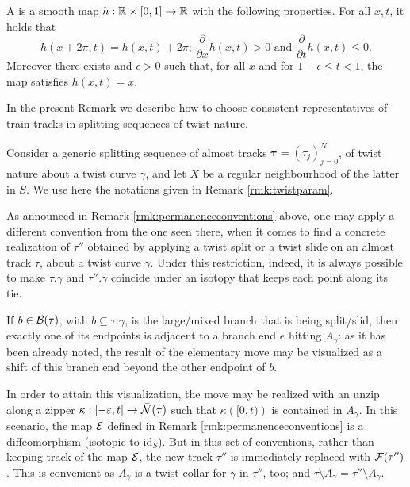\begin{defin}
A  is a smooth map $h:\mathbb R\times[0,1]\rightarrow \mathbb R$ with the following properties. For all $x,t$, it holds that
$$
h(x+2\pi,t)=h(x,t)+2\pi\text{; }\frac{\partial}{\partial x}h(x,t)>0 \text{ and }\frac{\partial}{\partial t} h(x,t)\leq 0.$$
Moreover there exists and $\epsilon>0$ such that, for all $x$ and for $1-\epsilon \leq t<1$, the map satisfies $h(x,t)=x$.
\end{defin}

\begin{rmk}\label{rmk:twistnaturemodelling}
In the present Remark we describe how to choose consistent representatives of train tracks in splitting sequences of twist nature.

Consider a generic splitting sequence of almost tracks $\bm\tau=(\tau_j)_{j=0}^N$, of twist nature about a twist curve $\gamma$, and let $X$ be a regular neighbourhood of the latter in $S$. We use here the notations given in Remark \ref{rmk:twistparam}. 

As announced in Remark \ref{rmk:permanenceconventions} above, one may apply a different convention from the one seen there, when it comes to find a concrete realization of $\tau''$ obtained by applying a twist split or a twist slide on an almost track $\tau$, about a twist curve $\gamma$. Under this restriction, indeed, it is always possible to make $\tau.\gamma$ and $\tau''.\gamma$ coincide under an isotopy that keeps each point along its tie.

If $b\in\mathcal B(\tau)$, with $b\subseteq \tau.\gamma$, is the large/mixed branch that is being split/slid, then exactly one of its endpoints is adjacent to a branch end $e$ hitting $A_\gamma$: as it has been already noted, the result of the elementary move may be visualized as a shift of this branch end beyond the other endpoint of $b$.

In order to attain this visualization, the move may be realized with an unzip along a zipper $\kappa:[-\varepsilon, t]\rightarrow \bar{{\mathcal N}}(\tau)$ such that $\kappa\left([0,t)\right)$ is contained in $A_\gamma$. In this scenario, the map $\mathcal{E}$ defined in Remark \ref{rmk:permanenceconventions} is a diffeomorphism (isotopic to $\mathrm{id}_S$). But in this set of conventions, rather than keeping track of the map $\mathcal{E}$, the new track $\tau''$ is immediately replaced with $\mathcal{F}(\tau'')$. This is convenient as $A_\gamma$ is a twist collar for $\gamma$ in $\tau''$, too; and $\tau\setminus A_\gamma=\tau''\setminus A_\gamma$.


\end{rmk}

